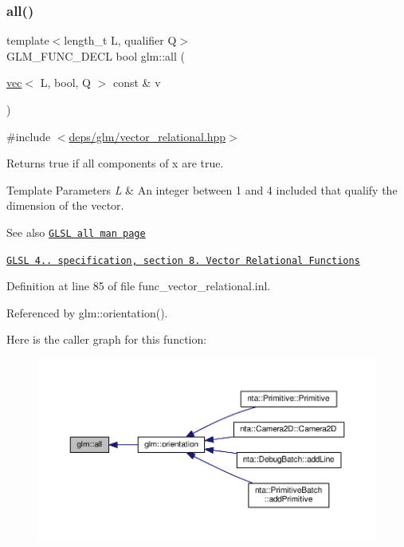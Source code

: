 \subsubsection{\texorpdfstring{all()}{all()}}
{\footnotesize\ttfamily template$<$length\+\_\+t L, qualifier Q$>$ \\
G\+L\+M\+\_\+\+F\+U\+N\+C\+\_\+\+D\+E\+CL bool glm\+::all (\begin{DoxyParamCaption}\item[{\hyperlink{structglm_1_1vec}{vec}$<$ L, bool, Q $>$ const \&}]{v }\end{DoxyParamCaption})}



{\ttfamily \#include $<$\hyperlink{vector__relational_8hpp}{deps/glm/vector\+\_\+relational.\+hpp}$>$}

Returns true if all components of x are true.


\begin{DoxyTemplParams}{Template Parameters}
{\em L} & An integer between 1 and 4 included that qualify the dimension of the vector.\\
\hline
\end{DoxyTemplParams}
\begin{DoxySeeAlso}{See also}
\href{http://www.opengl.org/sdk/docs/manglsl/xhtml/all.xml}{\tt G\+L\+SL all man page} 

\href{http://www.opengl.org/registry/doc/GLSLangSpec.4.20.8.pdf}{\tt G\+L\+SL 4.. specification, section 8. Vector Relational Functions} 
\end{DoxySeeAlso}


Definition at line 85 of file func\+\_\+vector\+\_\+relational.\+inl.



Referenced by glm\+::orientation().

Here is the caller graph for this function\+:
\nopagebreak
\begin{figure}[H]
\begin{center}
\leavevmode
\includegraphics[width=350pt]{d8/d06/group__core__func__vector__relational_gab5af106b2d5675d51af84815d937384d_icgraph}
\end{center}
\end{figure}
\mbox{\label{group__core__func__vector__relational_gadcc289349a96ef7642b14bc151ee4ae8}} 
